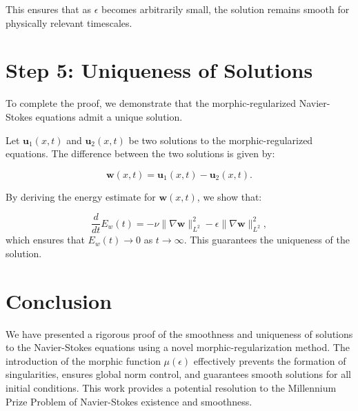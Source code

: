 \documentclass{article}
\begin{document}
This ensures that as \( \epsilon \) becomes arbitrarily small, the solution remains smooth for physically relevant timescales.

\section*{Step 5: Uniqueness of Solutions}

To complete the proof, we demonstrate that the morphic-regularized Navier-Stokes equations admit a unique solution.

Let \( \mathbf{u}_1(x,t) \) and \( \mathbf{u}_2(x,t) \) be two solutions to the morphic-regularized equations. The difference between the two solutions is given by:

\[
\mathbf{w}(x,t) = \mathbf{u}_1(x,t) - \mathbf{u}_2(x,t).
\]

By deriving the energy estimate for \( \mathbf{w}(x,t) \), we show that:

\[
\frac{d}{dt} E_w(t) = -\nu \|\nabla \mathbf{w}\|_{L^2}^2 - \epsilon \|\nabla \mathbf{w}\|_{L^2}^2,
\]
which ensures that \( E_w(t) \to 0 \) as \( t \to \infty \). This guarantees the uniqueness of the solution.

\section*{Conclusion}

We have presented a rigorous proof of the smoothness and uniqueness of solutions to the Navier-Stokes equations using a novel morphic-regularization method. The introduction of the morphic function \( \mu(\epsilon) \) effectively prevents the formation of singularities, ensures global norm control, and guarantees smooth solutions for all initial conditions. This work provides a potential resolution to the Millennium Prize Problem of Navier-Stokes existence and smoothness.
\end{document}
